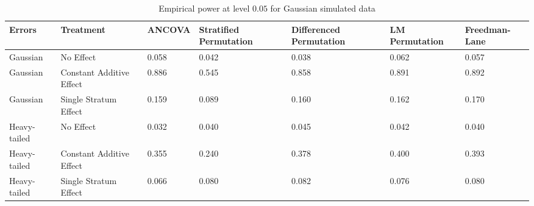 \begin{table}[ht]
\centering
\begin{tabular}{p{1.15in}|p{0.7in}|p{0.6in}p{0.8in}p{0.8in}p{0.8in}p{0.75in}}
  \hline
Errors & Treatment & ANCOVA & Stratified Permutation & Differenced Permutation & LM Permutation & Freedman-Lane \\ 
  \hline
Gaussian & No Effect & 0.058 & 0.042 & 0.038 & 0.062 & 0.057 \\ 
  Gaussian & Constant Additive Effect & 0.886 & 0.545 & 0.858 & 0.891 & 0.892 \\ 
  Gaussian & Single Stratum Effect & 0.159 & 0.089 & 0.160 & 0.162 & 0.170 \\ 
   \hline
Heavy-tailed & No Effect & 0.032 & 0.040 & 0.045 & 0.042 & 0.040 \\ 
  Heavy-tailed & Constant Additive Effect & 0.355 & 0.240 & 0.378 & 0.400 & 0.393 \\ 
  Heavy-tailed & Single Stratum Effect & 0.066 & 0.080 & 0.082 & 0.076 & 0.080 \\ 
   \hline
\end{tabular}
\caption{Empirical power at level $0.05$ for Gaussian simulated data} 
\label{tab:normal_power}
\end{table}
